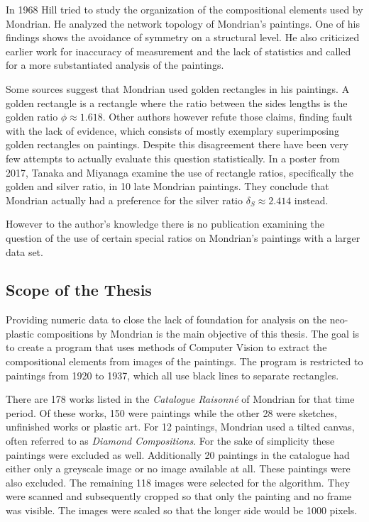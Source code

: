 \documentclass[serif,article,noparskip]{agse-thesis}
\begin{document}
In 1968 Hill \cite{Hill1968} tried to study the organization of the compositional
elements used by Mondrian. He analyzed the network topology of Mondrian's
paintings. One of his findings shows the avoidance of symmetry on a structural
level. He also criticized earlier work for inaccuracy of measurement and the
lack of statistics and called for a more substantiated analysis of the
paintings.

Some sources \cite{bouleau1963,bergamini1980} suggest that Mondrian used golden
rectangles in his paintings. A golden rectangle is a rectangle where the ratio
between the sides lengths is the golden ratio $\phi \approx 1.618$. Other authors
 \cite{Livio2002,Markowsky1992} however refute those claims, finding fault with
the lack of evidence, which consists of mostly exemplary superimposing golden
rectangles on paintings. Despite this disagreement there have been very few
attempts to actually evaluate this question statistically. In a poster from
2017, Tanaka and Miyanaga \cite{Tanaka2017} examine the use of rectangle ratios,
specifically the golden and silver ratio, in 10 late Mondrian paintings. They
conclude that Mondrian actually had a preference for the silver ratio $\delta_S
\approx 2.414$ instead.

However to the author's knowledge there is no publication examining the question of
the use of certain special ratios on Mondrian's paintings with a larger data
set.

\subsection{Scope of the Thesis}

Providing numeric data to close the lack of foundation for analysis on the
neo-plastic compositions by Mondrian is the main objective of this thesis. The
goal is to create a program that uses methods of Computer Vision to extract the
compositional elements from images of the paintings. The program is restricted
to paintings from 1920 to 1937, which all use black lines to separate rectangles.

There are 178 works listed in the \textit{Catalogue Raisonn{\'e}}
\cite{joosten1998} of Mondrian for that time period. Of these works, 150 were
paintings while the other 28 were sketches, unfinished works or plastic art. For
12 paintings, Mondrian used a tilted canvas, often referred to as
\textit{Diamond Compositions}. For the sake of simplicity these paintings were
excluded as well. Additionally 20 paintings in the catalogue had either only a
greyscale image or no image available at all. These paintings were also
excluded. The remaining 118 images were selected for the algorithm. They were
scanned and subsequently cropped so that only the painting and no frame was
visible. The images were scaled so that the longer side would be 1000 pixels.
\end{document}
